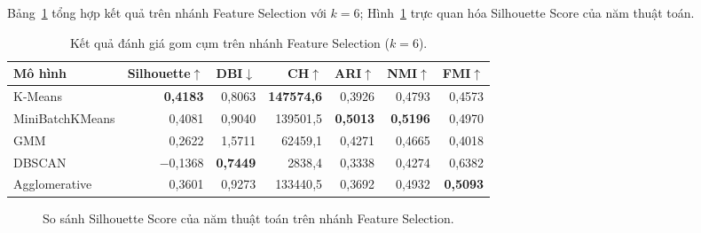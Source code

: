 Bảng~\ref{tab:clustering} tổng hợp kết quả trên nhánh Feature Selection với $k=6$; Hình~\ref{fig:sil} trực quan hóa Silhouette Score của năm thuật toán.

\begin{table}[h!]
\centering
\caption{Kết quả đánh giá gom cụm trên nhánh Feature Selection ($k=6$).}
\label{tab:clustering}
\small
\begin{tabular}{lrrrrrr}
\toprule
\textbf{Mô hình} & \textbf{Silhouette}$\uparrow$ & \textbf{DBI}$\downarrow$ & \textbf{CH}$\uparrow$ & \textbf{ARI}$\uparrow$ & \textbf{NMI}$\uparrow$ & \textbf{FMI}$\uparrow$\\
\midrule
K-Means & \textbf{0{,}4183} & 0{,}8063 & \textbf{147574{,}6} & 0{,}3926 & 0{,}4793 & 0{,}4573\\
MiniBatchKMeans & 0{,}4081 & 0{,}9040 & 139501{,}5 & \textbf{0{,}5013} & \textbf{0{,}5196} & 0{,}4970\\
GMM & 0{,}2622 & 1{,}5711 & 62459{,}1 & 0{,}4271 & 0{,}4665 & 0{,}4018\\
DBSCAN & $-$0{,}1368 & \textbf{0{,}7449} & 2838{,}4 & 0{,}3338 & 0{,}4274 & 0{,}6382\\
Agglomerative & 0{,}3601 & 0{,}9273 & 133440{,}5 & 0{,}3692 & 0{,}4932 & \textbf{0{,}5093}\\
\bottomrule
\end{tabular}
\end{table}

\begin{figure}[h!]
\centering
{}
\caption{So sánh Silhouette Score của năm thuật toán trên nhánh Feature Selection.}
\label{fig:sil}
\end{figure}

